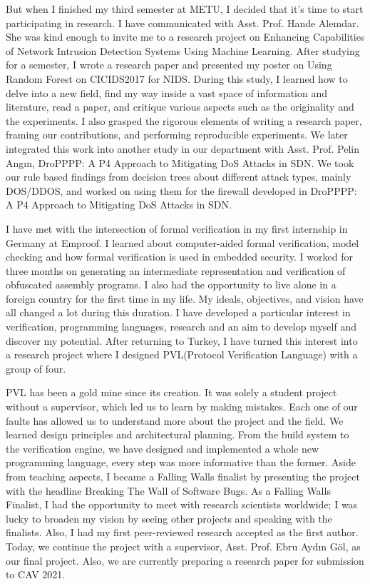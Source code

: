 \documentclass{letter}
\begin{document}
\begin{letter}{}
But when I finished my third semester at METU, I decided that it's time to start participating in research. I have communicated with Asst. Prof. Hande Alemdar. She was kind enough to invite me to a research project on Enhancing Capabilities of Network Intrusion Detection Systems Using Machine Learning. After studying for a semester, I wrote a research paper and presented my poster on Using Random Forest on CICIDS2017 for NIDS. During this study, I learned how to delve into a new field, find my way inside a vast space of information and literature, read a paper, and critique various aspects such as the originality and the experiments. I also grasped the rigorous elements of writing a research paper, framing our contributions, and performing reproducible experiments. We later integrated this work into another study in our department with Asst. Prof. Pelin Angın, DroPPPP: A P4 Approach to Mitigating DoS Attacks in SDN. We took our rule based findings from decision trees about different attack types, mainly DOS/DDOS, and worked on using them for the firewall developed in DroPPPP: A P4 Approach to Mitigating DoS Attacks in SDN. 

I have met with the intersection of formal verification in my first internship in Germany at Emproof. I learned about computer-aided formal verification,  model checking and how formal verification is used in embedded security. I worked for three months on generating an intermediate representation and verification of obfuscated assembly programs. I also had the opportunity to live alone in a foreign country for the first time in my life. My ideals, objectives, and vision have all changed a lot during this duration. I have developed a particular interest in verification, programming languages, research and an aim to develop myself and discover my potential. After returning to Turkey, I have turned this interest into a research project where I designed PVL(Protocol Verification Language) with a group of four. 

PVL has been a gold mine since its creation. It was solely a student project without a supervisor, which led us to learn by making mistakes. Each one of our faults has allowed us to understand more about the project and the field. We learned design principles and architectural planning. From the build system to the verification engine, we have designed and implemented a whole new programming language, every step was more informative than the former. Aside from teaching aspects, I became a Falling Walls finalist by presenting the project with the headline Breaking The Wall of Software Bugs. As a Falling Walls Finalist, I had the opportunity to meet with research scientists worldwide; I was lucky to broaden my vision by seeing other projects and speaking with the finalists. Also, I had my first peer-reviewed research accepted as the first author. Today, we continue the project with a supervisor, Asst. Prof. Ebru Aydın Göl, as our final project. Also, we are currently preparing a research paper for submission to CAV 2021. 


\end{letter}
\end{document}
